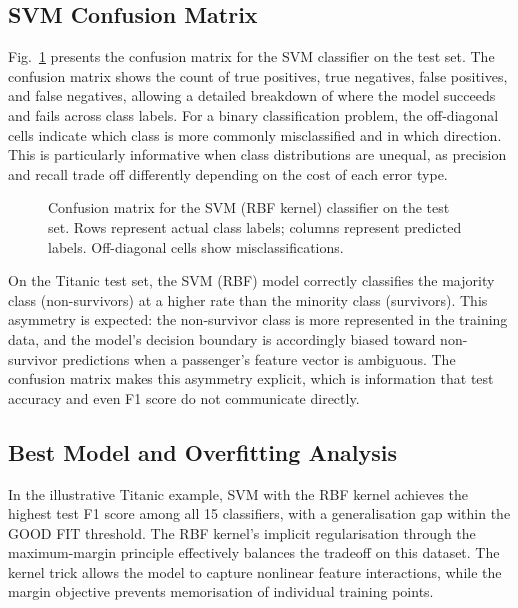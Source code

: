 \documentclass[conference]{IEEEtran}
\begin{document}
\subsection{SVM Confusion Matrix}

Fig.~\ref{fig:svm_cm} presents the confusion matrix for the SVM classifier on the test set. The confusion matrix shows the count of true positives, true negatives, false positives, and false negatives, allowing a detailed breakdown of where the model succeeds and fails across class labels. For a binary classification problem, the off-diagonal cells indicate which class is more commonly misclassified and in which direction. This is particularly informative when class distributions are unequal, as precision and recall trade off differently depending on the cost of each error type.

\begin{figure}[t]
    \centering
    \caption{Confusion matrix for the SVM (RBF kernel) classifier on the test set. Rows represent actual class labels; columns represent predicted labels. Off-diagonal cells show misclassifications.}
    \label{fig:svm_cm}
\end{figure}

On the Titanic test set, the SVM (RBF) model correctly classifies the majority class (non-survivors) at a higher rate than the minority class (survivors). This asymmetry is expected: the non-survivor class is more represented in the training data, and the model's decision boundary is accordingly biased toward non-survivor predictions when a passenger's feature vector is ambiguous. The confusion matrix makes this asymmetry explicit, which is information that test accuracy and even F1 score do not communicate directly.

\subsection{Best Model and Overfitting Analysis}

In the illustrative Titanic example, SVM with the RBF kernel achieves the highest test F1 score among all 15 classifiers, with a generalisation gap within the GOOD FIT threshold. The RBF kernel's implicit regularisation through the maximum-margin principle effectively balances the tradeoff on this dataset. The kernel trick allows the model to capture nonlinear feature interactions, while the margin objective prevents memorisation of individual training points.
\end{document}
